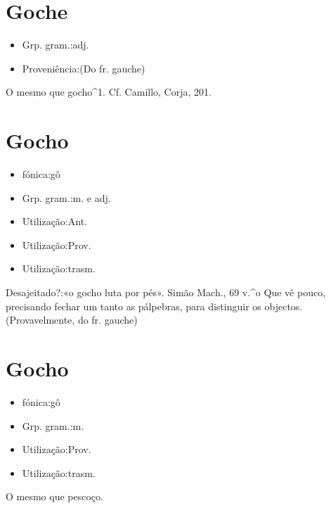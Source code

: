 \section{Goche}
\begin{itemize}
\item {Grp. gram.:adj.}
\end{itemize}
\begin{itemize}
\item {Proveniência:(Do fr. \textunderscore gauche\textunderscore )}
\end{itemize}
O mesmo que \textunderscore gocho\textunderscore ^1. Cf. Camillo, \textunderscore Corja\textunderscore , 201.
\section{Gocho}
\begin{itemize}
\item {fónica:gô}
\end{itemize}
\begin{itemize}
\item {Grp. gram.:m.  e  adj.}
\end{itemize}
\begin{itemize}
\item {Utilização:Ant.}
\end{itemize}
\begin{itemize}
\item {Utilização:Prov.}
\end{itemize}
\begin{itemize}
\item {Utilização:trasm.}
\end{itemize}
Desajeitado?:«\textunderscore o gocho luta por pés\textunderscore ». Simão Mach., 69 v.^o
Que vê pouco, precisando fechar um tanto as pálpebras, para distinguir os objectos.
(Provavelmente, do fr. \textunderscore gauche\textunderscore )
\section{Gocho}
\begin{itemize}
\item {fónica:gô}
\end{itemize}
\begin{itemize}
\item {Grp. gram.:m.}
\end{itemize}
\begin{itemize}
\item {Utilização:Prov.}
\end{itemize}
\begin{itemize}
\item {Utilização:trasm.}
\end{itemize}
O mesmo que \textunderscore pescoço\textunderscore .

